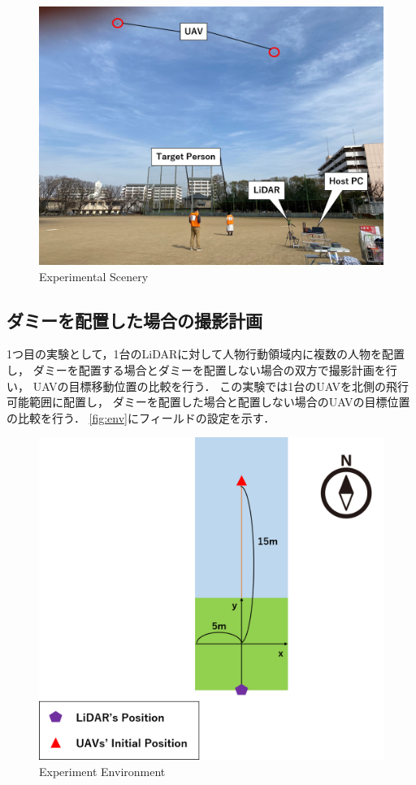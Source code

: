 \documentclass[autodetect-engine,dvipdfmx-if-dvi,ja=standard,a4j,jbase=11pt,magstyle=nomag*]{bxjsreport}
\begin{document}
\begin{figure}[h]
    \centering
    \includegraphics[width=0.8\linewidth, clip]{./figure/chapter5/picture.png}
    \caption{Experimental Scenery}
    \label{fig:picture}
\end{figure}

\newpage
\subsection{ダミーを配置した場合の撮影計画}
1つ目の実験として，1台のLiDARに対して人物行動領域内に複数の人物を配置し，
ダミーを配置する場合とダミーを配置しない場合の双方で撮影計画を行い，
UAVの目標移動位置の比較を行う．
この実験では1台のUAVを北側の飛行可能範囲に配置し，
ダミーを配置した場合と配置しない場合のUAVの目標位置の比較を行う．
\cref{fig:env}にフィールドの設定を示す．

\begin{figure}[h]
    \centering
    \includegraphics[width=0.6\linewidth, clip]{./figure/chapter5/setting.png}
    \caption{Experiment Environment}
    \label{fig:envi}
\end{figure}
\end{document}
